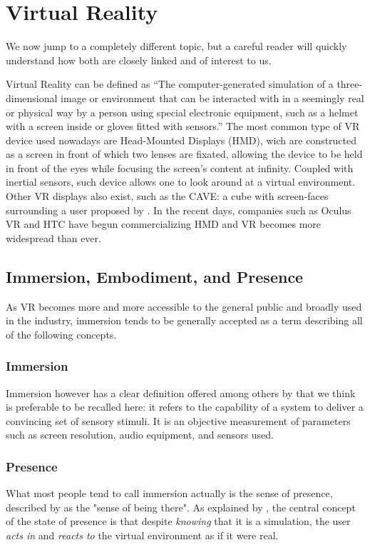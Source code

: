 \section{Virtual Reality}

We now jump to a completely different topic, but a careful reader will quickly understand how both are closely linked and of interest to us.

Virtual Reality can be defined as ``The computer-generated simulation of a three-dimensional image or environment that can be interacted with in a seemingly real or physical way by a person using special electronic equipment, such as a helmet with a screen inside or gloves fitted with sensors.'' \cite{oxford2015} The most common type of VR device used nowadays are Head-Mounted Displays (HMD), wich are constructed as a screen in front of which two lenses are fixated, allowing the device to be held in front of the eyes while focusing the screen's content at infinity. Coupled with inertial sensors, such device allows one to look around at a virtual environment. Other VR displays also exist, such as the CAVE: a cube with screen-faces surrounding a user proposed by \cite{cruz1992cave}. In the recent days, companies such as Oculus VR and HTC have begun commercializing HMD and VR becomes more widespread than ever.

\subsection{Immersion, Embodiment, and Presence}
As VR becomes more and more accessible to the general public and broadly used in the industry, immersion tends to be generally accepted as a term describing all of the following concepts.

\subsubsection{Immersion}
Immersion however has a clear definition offered among others by \cite{slater2003note,sanchez2005presence} that we think is preferable to be recalled here: it refers to the capability of a system to deliver a convincing set of sensory stimuli. It is an objective measurement of parameters such as screen resolution, audio equipment, and sensors used.

\subsubsection{Presence}
What most people tend to call immersion actually is the sense of presence, described by \cite{held1992telepresence,slater1993representations} as the "sense of being there". As explained by \cite{debarba2017embodiment}, the central concept of the state of presence is that despite \textit{knowing} that it is a simulation, the user \textit{acts in} and \textit{reacts to} the virtual environment as if it were real.


